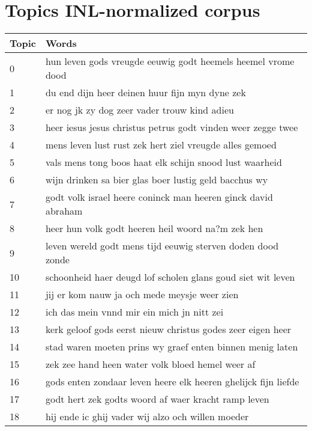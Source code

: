 \chapter{Topics INL-normalized corpus}

\begin{longtable}{p{} | p{}}
	\toprule
	Topic & Words \\       
	\midrule
	0     & hun leven gods vreugde eeuwig godt heemels heemel vrome dood      \\
	1     & du end dijn heer deinen huur fijn myn dyne zek                    \\
	2     & er nog jk zy dog zeer vader trouw kind adieu                      \\
	3     & heer iesus jesus christus petrus godt vinden weer zegge twee      \\
	4     & mens leven lust rust zek hert ziel vreugde alles gemoed           \\
	5     & vals mens tong boos haat elk schijn snood lust waarheid           \\
	6     & wijn drinken sa bier glas boer lustig geld bacchus wy             \\
	7     & godt volk israel heere coninck man heeren ginck david abraham     \\
	8     & heer hun volk godt heeren heil woord na?m zek hen                 \\
	9     & leven wereld godt mens tijd eeuwig sterven doden dood zonde       \\
	10    & schoonheid haer deugd lof scholen glans goud siet wit leven       \\
	11    & jij er kom nauw ja och mede meysje weer zien                      \\
	12    & ich das mein vnnd mir ein mich jn nitt zei                        \\
	13    & kerk geloof gods eerst nieuw christus godes zeer eigen heer       \\
	14    & stad waren moeten prins wy graef enten binnen menig laten         \\
	15    & zek zee hand heen water volk bloed hemel weer af                  \\
	16    & gods enten zondaar leven heere elk heeren ghelijck fijn liefde    \\
	17    & godt hert zek godts woord af waer kracht ramp leven               \\
	18    & hij ende ic ghij vader wij alzo och willen moeder                 \\

\end{longtable}
